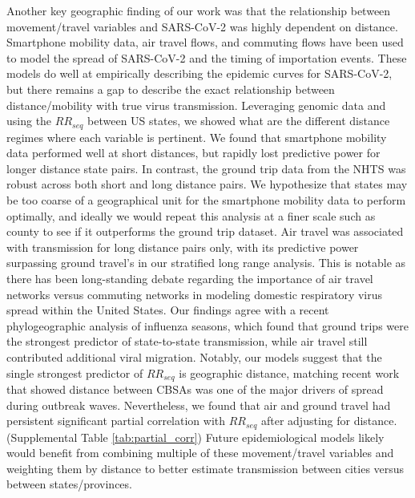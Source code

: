 \documentclass[11pt, letterpaper, oneside]{article}
\begin{document}
Another key geographic finding of our work was that the relationship between movement/travel variables and SARS-CoV-2 was highly dependent on distance.
Smartphone mobility data, air travel flows, and commuting flows have been used to model the spread of SARS-CoV-2 and the timing of importation events.\autocite{kuoAirlineTransportationArrival2021,jiaPopulationFlowDrives2020,zhanModelingPrediction20192020,badrAssociationMobilityPatterns2020a,changMobilityNetworkModels2021}
These models do well at empirically describing the epidemic curves for SARS-CoV-2, but there remains a gap to describe the exact relationship between distance/mobility with true virus transmission.
Leveraging genomic data and using the $RR_{seq}$ between US states, we showed what are the different distance regimes where each variable is pertinent.
We found that smartphone mobility data performed well at short distances, but rapidly lost predictive power for longer distance state pairs.
In contrast, the ground trip data from the NHTS was robust across both short and long distance pairs.
We hypothesize that states may be too coarse of a geographical unit for the smartphone mobility data to perform optimally, and ideally we would repeat this analysis at a finer scale such as county to see if it outperforms the ground trip dataset.
Air travel was associated with transmission for long distance pairs only, with its predictive power surpassing ground travel's in our stratified long range analysis.
This is notable as there has been long-standing debate regarding the importance of air travel networks versus commuting networks in modeling domestic respiratory virus spread within the United States.\autocite{brownsteinEmpiricalEvidenceEffect2006, viboudSynchronyWavesSpatial2006,charuHumanMobilitySpatial2017}
Our findings agree with a recent phylogeographic analysis of influenza seasons, which found that ground trips were the strongest predictor of state-to-state transmission, while air travel still contributed additional viral migration.\autocite{dejongCompetitionTransmissionLineages2025} 
Notably, our models suggest that the single strongest predictor of $RR_{seq}$ is geographic distance, matching recent work that showed distance between CBSAs was one of the major drivers of spread during outbreak waves.\autocite{callierSpatiotemporalSpreadCOVID192026}
Nevertheless, we found that air and ground travel had persistent significant partial correlation with $RR_{seq}$ after adjusting for distance.(Supplemental Table \ref{tab:partial_corr})
Future epidemiological models likely would benefit from combining multiple of these movement/travel variables and weighting them by distance to better estimate transmission between cities versus between states/provinces.
\end{document}
